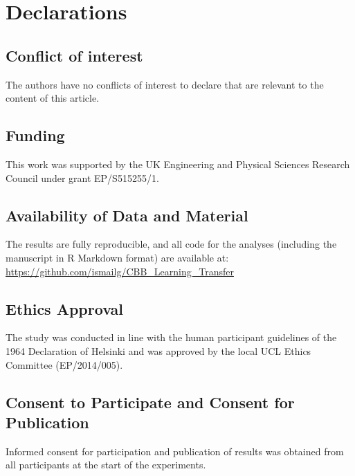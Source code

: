 \documentclass[smallextended]{svjour3}       %
\begin{document}
\hypertarget{declarations}{%
\section{Declarations}\label{declarations}}

\hypertarget{conflict-of-interest}{%
\subsection{Conflict of interest}\label{conflict-of-interest}}

The authors have no conflicts of interest to declare that are relevant
to the content of this article.

\hypertarget{funding}{%
\subsection{Funding}\label{funding}}

This work was supported by the UK Engineering and Physical Sciences
Research Council under grant EP/S515255/1.

\hypertarget{availability-of-data-and-material}{%
\subsection{Availability of Data and
Material}\label{availability-of-data-and-material}}

The results are fully reproducible, and all code for the analyses
(including the manuscript in R Markdown format) are available at:
\url{https://github.com/ismailg/CBB_Learning_Transfer}

\hypertarget{ethics-approval}{%
\subsection{Ethics Approval}\label{ethics-approval}}

The study was conducted in line with the human participant guidelines of
the 1964 Declaration of Helsinki and was approved by the local UCL
Ethics Committee (EP/2014/005).

\hypertarget{consent-to-participate-and-consent-for-publication}{%
\subsection{Consent to Participate and Consent for
Publication}\label{consent-to-participate-and-consent-for-publication}}

Informed consent for participation and publication of results was
obtained from all participants at the start of the experiments.
\end{document}
